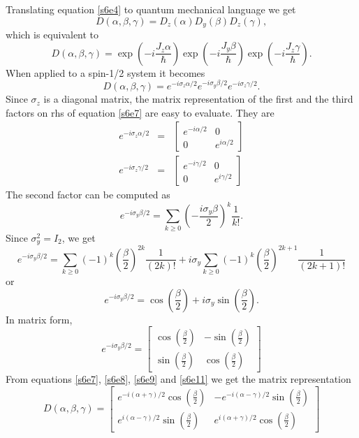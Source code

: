 \documentclass{article}
\numberwithin{equation}{section}
\theoremstyle{plain}
\numberwithin{thm}{section}
\theoremstyle{plain}
\numberwithin{prop}{section}
\theoremstyle{definition}
\numberwithin{defn}{section}
\theoremstyle{remark}
\begin{document}
Translating equation \eqref{s6e4} to quantum mechanical language we get
\begin{equation}\label{s6e5}
D(\alpha,\beta,\gamma) = D_z(\alpha)D_y(\beta)D_z(\gamma),
\end{equation}
which is equivalent to
\begin{equation}\label{s6e6}
D(\alpha,\beta,\gamma) = \exp\left(-i\frac{J_z\alpha}{\hslash}\right)
\exp\left(-i\frac{J_y\beta}{\hslash}\right)
\exp\left(-i\frac{J_z\gamma}{\hslash}\right).
\end{equation}
When applied to a spin-1/2 system it becomes
\begin{equation}\label{s6e7}
D(\alpha,\beta,\gamma) = e^{-i\sigma_z\alpha/2}e^{-i\sigma_y\beta/2}
e^{-i\sigma_z\gamma/2}.
\end{equation}
Since $\sigma_z$ is a diagonal matrix, the matrix representation of the first
and the third factors on rhs of equation \eqref{s6e7} are easy to evaluate.
They are
\begin{eqnarray}
e^{-i\sigma_z\alpha/2} &=& \begin{bmatrix}e^{-i\alpha/2} & 0 \\
0 & e^{i\alpha/2}\end{bmatrix} \label{s6e8} \\
e^{-i\sigma_z\gamma/2} &=& \begin{bmatrix}e^{-i\gamma/2} & 0 \\
0 & e^{i\gamma/2}\end{bmatrix} \label{s6e9}
\end{eqnarray}
The second factor can be computed as
\[
e^{-i\sigma_y\beta/2} = \sum_{k\ge 0}\left(-\frac{i\sigma_y\beta}{2}\right)^k
\frac{1}{k!}.
\]
Since $\sigma_y^2 = I_2$, we get
\[
e^{-i\sigma_y\beta/2} = \sum_{k\ge 0}(-1)^k\left(\frac{\beta}{2}\right)^{2k}
\frac{1}{(2k)!} + 
i\sigma_y\sum_{k\ge 0}(-1)^k\left(\frac{\beta}{2}\right)^{2k+1}\frac{1}{(2k+1)!}
\]
or
\begin{equation}\label{s6e10}
e^{-i\sigma_y\beta/2} = \cos\left(\frac{\beta}{2}\right) + i\sigma_y
\sin\left(\frac{\beta}{2}\right).
\end{equation}
In matrix form,
\begin{equation}\label{s6e11}
e^{-i\sigma_y\beta/2} = \begin{bmatrix}
\cos\left(\frac{\beta}{2}\right) & -\sin\left(\frac{\beta}{2}\right) \\
\sin\left(\frac{\beta}{2}\right) & \cos\left(\frac{\beta}{2}\right)
\end{bmatrix}
\end{equation}
From equations \eqref{s6e7}, \eqref{s6e8}, \eqref{s6e9} and \eqref{s6e11}
we get the matrix representation
\begin{equation}\label{s6e12}
D(\alpha,\beta,\gamma) = \begin{bmatrix}
e^{-i(\alpha+\gamma)/2}\cos\left(\frac{\beta}{2}\right) & 
-e^{-i(\alpha-\gamma)/2}\sin\left(\frac{\beta}{2}\right) \\
e^{i(\alpha-\gamma)/2}\sin\left(\frac{\beta}{2}\right) & 
e^{i(\alpha+\gamma)/2}\cos\left(\frac{\beta}{2}\right)
\end{bmatrix}
\end{equation}
\end{document}
